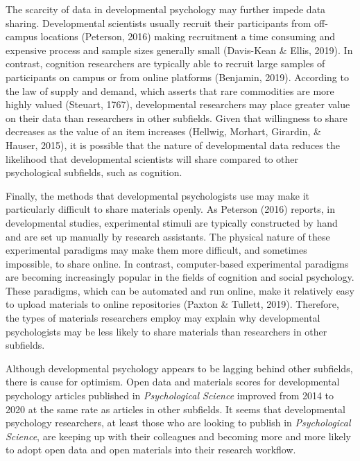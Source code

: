 \documentclass[
  english,
  man,floatsintext]{apa6}
\begin{document}
The scarcity of data in developmental psychology may further impede data sharing. Developmental scientists usually recruit their participants from off-campus locations (Peterson, 2016) making recruitment a time consuming and expensive process and sample sizes generally small (Davis-Kean \& Ellis, 2019). In contrast, cognition researchers are typically able to recruit large samples of participants on campus or from online platforms (Benjamin, 2019). According to the law of supply and demand, which asserts that rare commodities are more highly valued (Steuart, 1767), developmental researchers may place greater value on their data than researchers in other subfields. Given that willingness to share decreases as the value of an item increases (Hellwig, Morhart, Girardin, \& Hauser, 2015), it is possible that the nature of developmental data reduces the likelihood that developmental scientists will share compared to other psychological subfields, such as cognition.

Finally, the methods that developmental psychologists use may make it particularly difficult to share materials openly. As Peterson (2016) reports, in developmental studies, experimental stimuli are typically constructed by hand and are set up manually by research assistants. The physical nature of these experimental paradigms may make them more difficult, and sometimes impossible, to share online. In contrast, computer-based experimental paradigms are becoming increasingly popular in the fields of cognition and social psychology. These paradigms, which can be automated and run online, make it relatively easy to upload materials to online repositories (Paxton \& Tullett, 2019). Therefore, the types of materials researchers employ may explain why developmental psychologists may be less likely to share materials than researchers in other subfields.

Although developmental psychology appears to be lagging behind other subfields, there is cause for optimism. Open data and materials scores for developmental psychology articles published in \emph{Psychological Science} improved from 2014 to 2020 at the same rate as articles in other subfields. It seems that developmental psychology researchers, at least those who are looking to publish in \emph{Psychological Science}, are keeping up with their colleagues and becoming more and more likely to adopt open data and open materials into their research workflow.
\end{document}
